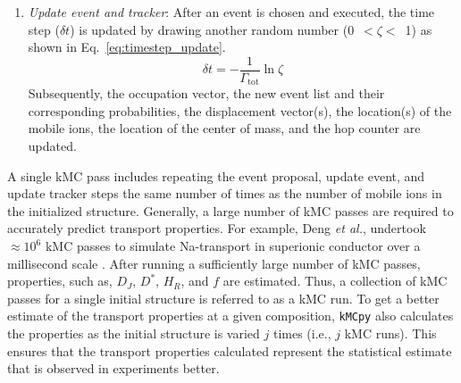 \documentclass[a4paper,fleqn]{cas-dc}
\begin{document}
{\begin{enumerate}
    \item \emph{Update event and tracker}: After an event is chosen and executed, the time step ($\delta t$) is updated by drawing another random number (0~$< \zeta <$~1) as shown in Eq.~\ref{eq:timestep_update}.
    \begin{equation}
        \label{eq:timestep_update}
        \delta t = - \frac{1}{\Gamma_\mathrm{tot}} \ln{\zeta}
    \end{equation}
    Subsequently, the occupation vector, the new event list and their corresponding 
    probabilities, the displacement vector(s), the location(s) of the mobile ions, the location of the center of mass, and the hop counter are updated. 
\end{enumerate}

A single kMC pass includes repeating the event proposal, update event, and update tracker steps the same number of times as the number of mobile ions in the initialized structure. Generally, a large number of kMC passes are required to accurately predict transport properties. For example, Deng \textit{et al.}, undertook $\approx 10^{6}$ kMC passes to simulate Na-transport in  superionic conductor  over a millisecond scale \cite{deng_fundamental_2022}. After running a sufficiently large number of kMC passes, properties, such as, $D_J$, $D^{*}$, $H_R$, and $f$ are estimated. Thus, a collection of kMC passes for a single initial structure is referred to as a kMC run.  To get a better estimate of the transport properties at a given composition, \texttt{kMCpy} also calculates the properties as the initial structure is varied $j$ times (i.e., $j$ kMC runs). This ensures that the transport properties calculated represent the statistical estimate that is observed in experiments better.


}
\end{document}
